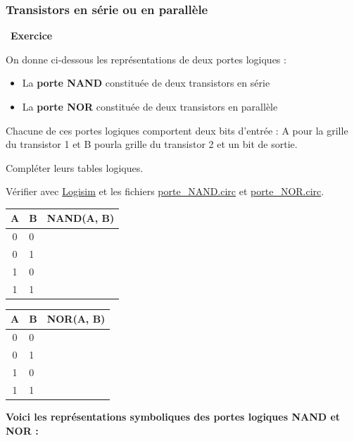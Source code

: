 \documentclass[
  11pt,
]{article}
\providecommand{\tightlist}{%
  \setlength{\itemsep}{0pt}\setlength{\parskip}{0pt}}
\newcounter{exo}
\newenvironment{exercice}[1]
{\par \medskip   \addtocounter{exo}{1} \noindent  
\begin{bclogo}[arrondi =0.1,   noborder = true, logo=\bccrayon, marge=4]{~\textbf{Exercice} \textbf{\theexo} {\itshape #1} }  \par}
{
\end{bclogo}
 \par \bigskip }
\newcounter{logi}
\begin{document}
\hypertarget{transistors-en-suxe9rie-ou-en-paralluxe8le}{%
\subsubsection{Transistors en série ou en
parallèle}\label{transistors-en-suxe9rie-ou-en-paralluxe8le}}

\begin{exercice}{}

On donne ci-dessous les représentations de deux portes logiques :

\begin{itemize}
\tightlist
\item
  La \textbf{porte NAND} constituée de deux transistors en série
\item
  La \textbf{porte NOR} constituée de deux transistors en parallèle
\end{itemize}

Chacune de ces portes logiques comportent deux bits d'entrée : A pour la
grille du transistor 1 et B pourla grille du transistor 2 et un bit de
sortie.

Compléter leurs tables logiques.

Vérifier avec \href{http://www.cburch.com/logisim/}{Logisim} et les
fichiers \href{ircuits_logisim/porte_NAND.circ}{porte\_NAND.circ} et
\href{circuits_logisim/porte_NOR.circ}{porte\_NOR.circ}.

\begin{longtable}[]{@{}cll@{}}
\toprule
A & B & NAND(A, B)\tabularnewline
\midrule
\endhead
0 & 0 &\tabularnewline
0 & 1 &\tabularnewline
1 & 0 &\tabularnewline
1 & 1 &\tabularnewline
\bottomrule
\end{longtable}

\begin{longtable}[]{@{}cll@{}}
\toprule
A & B & NOR(A, B)\tabularnewline
\midrule
\endhead
0 & 0 &\tabularnewline
0 & 1 &\tabularnewline
1 & 0 &\tabularnewline
1 & 1 &\tabularnewline
\bottomrule
\end{longtable}

\end{exercice}

\textbf{Voici les représentations symboliques des portes logiques NAND
et NOR :}
\end{document}
